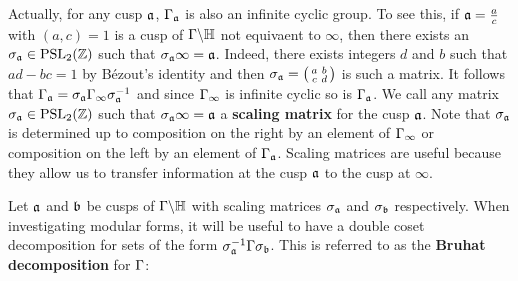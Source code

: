       Actually, for any cusp $\mathfrak{a}$, $\Gamma_{\mathfrak{a}}$ is also an infinite cyclic group. To see this, if $\mathfrak{a} = \frac{a}{c}$ with $(a,c) = 1$ is a cusp of $\Gamma\backslash\mathbb{H}$ not equivaent to $\infty$, then there exists an $\sigma_{\mathfrak{a}} \in \mathrm{PSL}_{2}(\mathbb{Z})$ such that $\sigma_{\mathfrak{a}}\infty = \mathfrak{a}$. Indeed, there exists integers $d$ and $b$ such that $ad-bc = 1$ by B\'ezout's identity and then $\sigma_{\mathfrak{a}} = \begin{psmallmatrix} a & b \\ c & d \end{psmallmatrix}$ is such a matrix. It follows that $\Gamma_{\mathfrak{a}} = \sigma_{\mathfrak{a}}\Gamma_{\infty}\sigma_{\mathfrak{a}}^{-1}$ and since $\Gamma_{\infty}$ is infinite cyclic so is $\Gamma_{\mathfrak{a}}$. We call any matrix $\sigma_{\mathfrak{a}} \in \mathrm{PSL}_{2}(\mathbb{Z})$ such that $\sigma_{\mathfrak{a}}\infty = \mathfrak{a}$ a \textbf{scaling matrix} for the cusp $\mathfrak{a}$. Note that $\sigma_{\mathfrak{a}}$ is determined up to composition on the right by an element of $\Gamma_{\infty}$ or composition on the left by an element of $\Gamma_{\mathfrak{a}}$. Scaling matrices are useful because they allow us to transfer information at the cusp $\mathfrak{a}$ to the cusp at $\infty$. 

      Let $\mathfrak{a}$ and $\mathfrak{b}$ be cusps of $\Gamma\backslash\mathbb{H}$ with scaling matrices $\sigma_{\mathfrak{a}}$ and $\sigma_{\mathfrak{b}}$ respectively. When investigating modular forms, it will be useful to have a double coset decomposition for sets of the form $\sigma_{\mathfrak{a}}^{-1}\Gamma\sigma_{\mathfrak{b}}$. This is referred to as the \textbf{Bruhat decomposition} for $\Gamma$:

